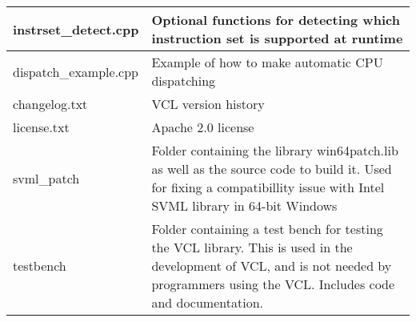 \documentclass[vcl_manual.tex]{subfiles}
\begin{document}
\begin{longtable}[l]{|p{40mm}|p{100mm}|}
instrset\_detect.cpp & Optional functions for detecting which instruction set is supported at runtime \\ \hline

dispatch\_example.cpp & Example of how to make automatic CPU dispatching \\ \hline

changelog.txt & VCL version history \\ \hline

license.txt & Apache 2.0 license \\ \hline

svml\_patch & Folder containing the library win64patch.lib as well as the source code to build it. Used for fixing a compatibillity issue with Intel SVML library in 64-bit Windows \\ \hline

testbench & Folder containing a test bench for testing the VCL library. This is used in the development of VCL, and is not needed by programmers using the VCL. Includes code and documentation. \\ \hline

\end{longtable}
\end{document}
